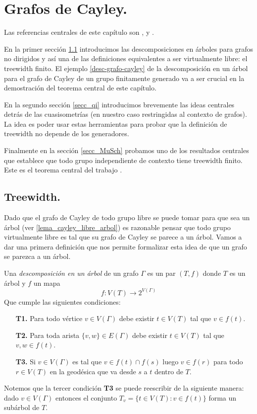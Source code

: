 \documentclass[tesis.tex]{subfiles}
\begin{document}
	
\chapter{Grafos de Cayley.} \label{seccion_treewidth}

Las referencias centrales de este capítulo son \cite{diekert2017context}, \cite{kuske2005logical} y \cite{diestel2005graph}.

En la primer sección \ref{secc_tw} introducimos las descomposiciones en árboles para grafos no dirigidos y así una de las definiciones equivalentes a ser virtualmente libre: el treewidth finito.
El ejemplo \ref{desc-grafo-cayley} de la descomposición en un árbol para el grafo de Cayley de un grupo finitamente generado va a ser crucial en la demostración del teorema central de este capítulo.


En la segundo sección \ref{secc_qi} introducimos brevemente las ideas centrales detrás de las cuasisometrías (en nuestro caso restringidas al contexto de grafos).
La idea es poder usar estas herramientas para probar que la definición de treewidth no depende de los generadores.

Finalmente en la sección \ref{secc_MuSch} probamos uno de los resultados centrales que establece que todo grupo independiente de contexto tiene treewidth finito.
Este es el teorema central del trabajo \cite{muller1983groups}.



\section{Treewidth.}\label{secc_tw}

Dado que el grafo de Cayley de todo grupo libre se puede tomar para que sea un árbol (ver \ref{lema_cayley_libre_arbol}) es razonable pensar que todo grupo virtualmente libre es tal que su grafo de Cayley se parece a un árbol. 
Vamos a dar una primera definición que nos permite formalizar esta idea de que un grafo se parezca a un árbol.


\begin{deff}\label{desc-arbol}
	Una \emph{descomposición en un árbol} de un grafo $\Gamma$ es un par $(T,f)$ donde
	$T$ es un árbol y $f$ un mapa 
	\[
	f: V(T) \to 2^{V(\Gamma)}
	\]
	Que cumple las siguientes condiciones:
	\begin{enumerate}
		\item[\textbf{T1.}] Para todo vértice $v \in V(\Gamma)$ debe existir $t \in V(T)$ tal que $v \in f(t)$. 
		\item[\textbf{T2.}] Para toda arista $\{v,w\} \in E(\Gamma)$ 
		debe existir $t \in V(T)$ tal que $v,w \in f(t)$.
		\item[\textbf{T3.}] Si $v \in V(\Gamma)$ es tal que $v \in f(t) \cap f(s)$ luego $v \in f(r)$ para todo $r \in V(T)$ en la geodésica que va desde $s$ a $t$ dentro de $T$.  
	\end{enumerate} 
\end{deff}
Notemos que la tercer condición \textbf{T3} se puede reescribir de la siguiente manera:
dado $v \in V(\Gamma)$ entonces el conjunto $T_{v} = \{ t \in V(T) :  v \in f(t) \}$ forma un subárbol de $T$.
\end{document}
